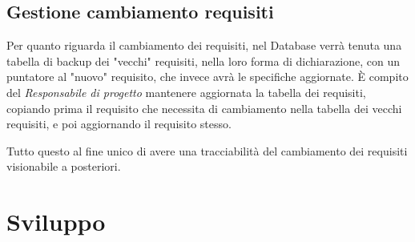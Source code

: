 \documentclass[a4paper]{report}
\begin{document}
	\subsection{Gestione cambiamento requisiti}
	Per quanto riguarda il cambiamento dei requisiti, nel Database verrà tenuta una tabella di backup dei "vecchi" requisiti, 
	nella loro forma di dichiarazione, con un puntatore al "nuovo" requisito, che invece avrà le specifiche aggiornate. È compito del
	\emph{Responsabile di progetto} mantenere aggiornata la tabella dei requisiti, copiando prima il requisito che necessita di cambiamento
	nella tabella dei vecchi requisiti, e poi aggiornando il requisito stesso.
	
	Tutto questo al fine unico di avere una tracciabilità del cambiamento dei requisiti visionabile a posteriori.
	\section{Sviluppo}
\end{document}
